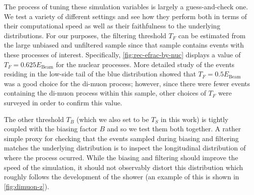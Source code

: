 The process of tuning these simulation variables is largely a guess-and-check one.
We test a variety of different settings and see how they perform both in terms of
their computational speed as well as their faithfulness to the underlying distributions.
For our purposes, the filtering threshold $T_F$ can be estimated from the large unbiased
and unfiltered sample since that sample contains events with these processes of interest.
Specifically, \cref{fig:rec-efrac-by-nuc} displays a value of $T_F = 0.625E_\text{Beam}$ for
the nuclear processes.
More detailed study of the events residing in the low-side tail of the blue distribution
showed that $T_F = 0.5E_\text{Beam}$ was a good choice for the di-muon process; however,
since there were fewer events containing the di-muon process within this sample,
other choices of $T_F$ were surveyed in order to confirm this value.

The other threshold $T_B$ (which we also set to be $T_S$ in this work) is tightly coupled
with the biasing factor $B$ and so we test them both together.
A rather simple proxy for checking that the events sampled during biasing and filtering
matches the underlying distribution is to inspect the longitudinal distribution of where
the process ocurred.
While the biasing and filtering should improve the speed of the simulation,
it should not observably distort this distribution which roughly follows the development of
the shower (an example of this is shown in \cref{fig:dimuon-z}).

